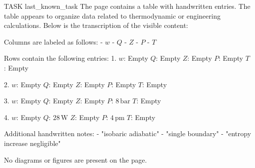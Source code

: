 TASK {last_known_task}  
The page contains a table with handwritten entries. The table appears to organize data related to thermodynamic or engineering calculations. Below is the transcription of the visible content:

Columns are labeled as follows:
- \( w \)
- \( Q \)
- \( Z \)
- \( P \)
- \( T \)

Rows contain the following entries:
1. \( w \): Empty  
   \( Q \): Empty  
   \( Z \): Empty  
   \( P \): Empty  
   \( T \): Empty  

2. \( w \): Empty  
   \( Q \): Empty  
   \( Z \): Empty  
   \( P \): Empty  
   \( T \): Empty  

3. \( w \): Empty  
   \( Q \): Empty  
   \( Z \): Empty  
   \( P \): \( 8 \, \text{bar} \)  
   \( T \): Empty  

4. \( w \): Empty  
   \( Q \): \( 28 \, \text{W} \)  
   \( Z \): Empty  
   \( P \): \( 4 \, \text{pm} \)  
   \( T \): Empty  

Additional handwritten notes:
- "isobaric adiabatic"
- "single boundary"
- "entropy increase negligible"

No diagrams or figures are present on the page.

